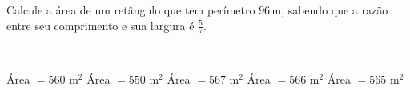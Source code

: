 \parbox{\linewidth}{

Calcule a área de um retângulo que tem perímetro $96$\,m, sabendo que a razão entre seu comprimento e sua largura é $\frac{5}{7}$.}\vspace{2mm}\\\parbox{\linewidth}{

Área $=560$ m$^2$
Área $=550$ m$^2$
Área $=567$ m$^2$
Área $=566$ m$^2$
Área $=565$ m$^2$

}

